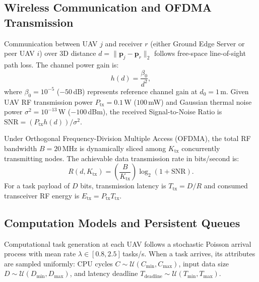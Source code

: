 \documentclass[conference]{IEEEtran}
\begin{document}
\subsection{Wireless Communication and OFDMA Transmission}
Communication between UAV $j$ and receiver $r$ (either Ground Edge Server or peer UAV $i$) over 3D distance $d = \|\mathbf{p}_j - \mathbf{p}_r\|_2$ follows free-space line-of-sight path loss. The channel power gain is:
\begin{equation}
h(d) = \frac{\beta_0}{d^2},
\end{equation}
where $\beta_0 = 10^{-5}$ ($-50$\,dB) represents reference channel gain at $d_0 = 1$\,m. Given UAV RF transmission power $P_{\text{tx}} = 0.1$\,W ($100$\,mW) and Gaussian thermal noise power $\sigma^2 = 10^{-13}$\,W ($-100$\,dBm), the received Signal-to-Noise Ratio is $\text{SNR} = (P_{\text{tx}} h(d)) / \sigma^2$.

Under Orthogonal Frequency-Division Multiple Access (OFDMA), the total RF bandwidth $B = 20$\,MHz is dynamically sliced among $K_{\text{tx}}$ concurrently transmitting nodes. The achievable data transmission rate in bits/second is:
\begin{equation}
R(d, K_{\text{tx}}) = \left(\frac{B}{K_{\text{tx}}}\right) \log_2(1 + \text{SNR}).
\end{equation}
For a task payload of $D$ bits, transmission latency is $T_{\text{tx}} = D / R$ and consumed transceiver RF energy is $E_{\text{tx}} = P_{\text{tx}} T_{\text{tx}}$.

\subsection{Computation Models and Persistent Queues}
Computational task generation at each UAV follows a stochastic Poisson arrival process with mean rate $\lambda \in [0.8, 2.5]$\,tasks/s. When a task arrives, its attributes are sampled uniformly: CPU cycles $C \sim \mathcal{U}(C_{\text{min}}, C_{\text{max}})$, input data size $D \sim \mathcal{U}(D_{\text{min}}, D_{\text{max}})$, and latency deadline $T_{\text{deadline}} \sim \mathcal{U}(T_{\text{min}}, T_{\text{max}})$.
\end{document}
